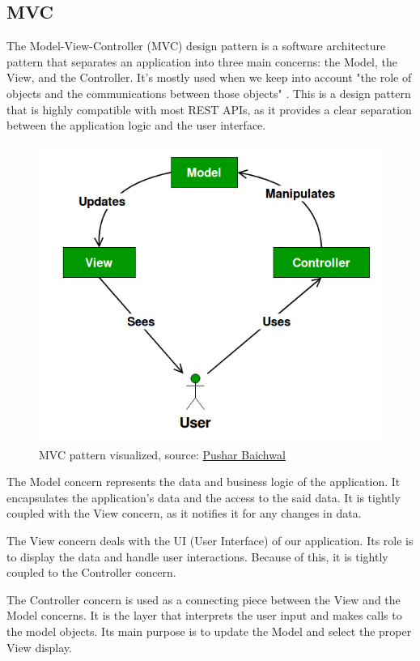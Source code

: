\subsection{MVC}
The Model-View-Controller (MVC) design pattern is a software architecture pattern that separates an application into three main concerns: 
the Model, the View, and the Controller.
It's mostly used when we keep into account "the role of objects and the communications between those objects" \cite{mvcQ}.
This is a design pattern that is highly compatible with most REST APIs, as it provides a clear separation between the application logic and the user interface.
\begin{figure}[htbp]
    \centering
    \includegraphics[scale=0.4]{pictures/mvc.png}
    \caption{MVC pattern visualized, source: \href{https://pushkarbaichwal7937.medium.com/model-view-controller-in-java-e57b1f754c9e}{Pushar Baichwal}}
    \label{mvcExample}
\end{figure}
\par
The Model concern represents the data and business logic of the application.
It encapsulates the application's data and the access to the said data.
It is tightly coupled with the View concern, as it notifies it for any changes in data.
\par
The View concern deals with the UI (User Interface) of our application.
Its role is to display the data and handle user interactions.
Because of this, it is tightly coupled to the Controller concern.
\par
The Controller concern is used as a connecting piece between the View and the Model concerns.
It is the layer that interprets the user input and makes calls to the model objects.
Its main purpose is to update the Model and select the proper View display.


